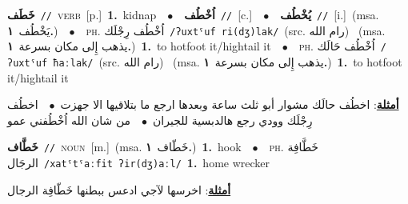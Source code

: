 \documentclass[10pt,a4paper,twoside]{article} %
\begin{document}
\begin{multicols}{2}
{\setlength\topsep{0pt}\textbf{\foreignlanguage{arabic}{خَطَف}}\ {\color{gray}\texttt{//}\color{black}}\ \textsc{verb}\ [p.]\ \textbf{1.}~kidnap\ \ $\bullet$\ \ \setlength\topsep{0pt}\textbf{\foreignlanguage{arabic}{اُخْطُف}}\ {\color{gray}\texttt{//}\color{black}}\ [c.]\ \ $\bullet$\ \ \setlength\topsep{0pt}\textbf{\foreignlanguage{arabic}{يُخْطُف}}\ {\color{gray}\texttt{//}\color{black}}\ [i.]\ \color{gray}(msa. \foreignlanguage{arabic}{يَخْطُف}~\foreignlanguage{arabic}{\textbf{١.}})\color{black}\ \ $\bullet$\ \ \textsc{ph.} \color{gray} \foreignlanguage{arabic}{اُخْطُف رِجْلَك}\color{black}\ {\color{gray}\texttt{/{\sffamily ʔuxtˤuf ri(dʒ)lak}/}\color{black}}\ \color{gray}(src. \foreignlanguage{arabic}{رام الله})\color{black}\ \color{gray} (msa. \foreignlanguage{arabic}{يذهب إِلى مكان بسرعة}~\foreignlanguage{arabic}{\textbf{١.}})\color{black}\ \textbf{1.}~to hotfoot it/hightail it\ \ $\bullet$\ \ \textsc{ph.} \color{gray} \foreignlanguage{arabic}{اُخْطُف حَالَك}\color{black}\ {\color{gray}\texttt{/{\sffamily ʔuxtˤuf ħaːlak}/}\color{black}}\ \color{gray}(src. \foreignlanguage{arabic}{رام الله})\color{black}\ \color{gray} (msa. \foreignlanguage{arabic}{يذهب إِلى مكان بسرعة}~\foreignlanguage{arabic}{\textbf{١.}})\color{black}\ \textbf{1.}~to hotfoot it/hightail it\  \begin{flushright}\color{gray}\foreignlanguage{arabic}{\textbf{\underline{\foreignlanguage{arabic}{أمثلة}}}: اخطُف حالَك مشوار أبو ثلث ساعة وبعدها ارجع ما بتلاقيها الا جهزت\ $\bullet$\ \  اخطُف رِجْلَك وودي رجع هالدبسية للجيران\ $\bullet$\ \  من شان الله اُخْطُفني عمو}\end{flushright}\color{black}} \vspace{2mm}

{\setlength\topsep{0pt}\textbf{\foreignlanguage{arabic}{خَطَّاف}}\ {\color{gray}\texttt{//}\color{black}}\ \textsc{noun}\ [m.]\ \color{gray}(msa. \foreignlanguage{arabic}{خَطّاف}~\foreignlanguage{arabic}{\textbf{١.}})\color{black}\ \textbf{1.}~hook\ \ $\bullet$\ \ \textsc{ph.} \color{gray} \foreignlanguage{arabic}{خَطَّافِة الرجَال}\color{black}\ {\color{gray}\texttt{/{\sffamily xatˤtˤaːfit ʔir(dʒ)aːl}/}\color{black}}\ \textbf{1.}~home wrecker\  \begin{flushright}\color{gray}\foreignlanguage{arabic}{\textbf{\underline{\foreignlanguage{arabic}{أمثلة}}}: اخرسها لآجي ادعس ببطنها خَطّافِة الرجال}\end{flushright}\color{black}} \vspace{2mm}


\end{multicols}
\end{document}
